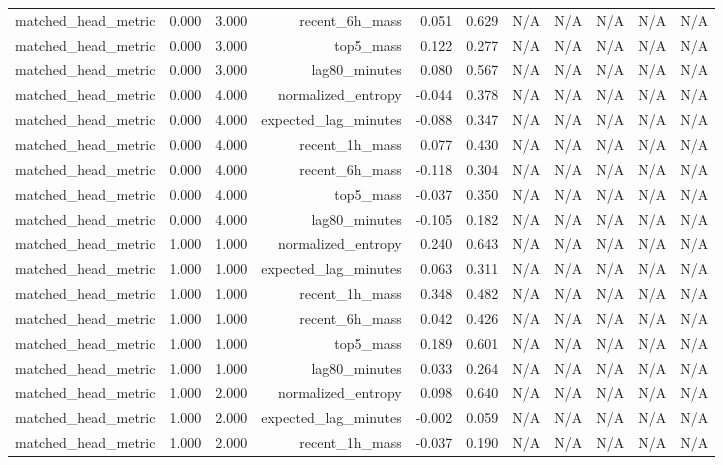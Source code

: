 \begin{table}[h!]
\begin{tabular}{lrrrrrrrrrr}
matched\_head\_metric & 0.000 & 3.000 & recent\_6h\_mass & 0.051 & 0.629 & N/A & N/A & N/A & N/A & N/A \\
matched\_head\_metric & 0.000 & 3.000 & top5\_mass & 0.122 & 0.277 & N/A & N/A & N/A & N/A & N/A \\
matched\_head\_metric & 0.000 & 3.000 & lag80\_minutes & 0.080 & 0.567 & N/A & N/A & N/A & N/A & N/A \\
matched\_head\_metric & 0.000 & 4.000 & normalized\_entropy & -0.044 & 0.378 & N/A & N/A & N/A & N/A & N/A \\
matched\_head\_metric & 0.000 & 4.000 & expected\_lag\_minutes & -0.088 & 0.347 & N/A & N/A & N/A & N/A & N/A \\
matched\_head\_metric & 0.000 & 4.000 & recent\_1h\_mass & 0.077 & 0.430 & N/A & N/A & N/A & N/A & N/A \\
matched\_head\_metric & 0.000 & 4.000 & recent\_6h\_mass & -0.118 & 0.304 & N/A & N/A & N/A & N/A & N/A \\
matched\_head\_metric & 0.000 & 4.000 & top5\_mass & -0.037 & 0.350 & N/A & N/A & N/A & N/A & N/A \\
matched\_head\_metric & 0.000 & 4.000 & lag80\_minutes & -0.105 & 0.182 & N/A & N/A & N/A & N/A & N/A \\
matched\_head\_metric & 1.000 & 1.000 & normalized\_entropy & 0.240 & 0.643 & N/A & N/A & N/A & N/A & N/A \\
matched\_head\_metric & 1.000 & 1.000 & expected\_lag\_minutes & 0.063 & 0.311 & N/A & N/A & N/A & N/A & N/A \\
matched\_head\_metric & 1.000 & 1.000 & recent\_1h\_mass & 0.348 & 0.482 & N/A & N/A & N/A & N/A & N/A \\
matched\_head\_metric & 1.000 & 1.000 & recent\_6h\_mass & 0.042 & 0.426 & N/A & N/A & N/A & N/A & N/A \\
matched\_head\_metric & 1.000 & 1.000 & top5\_mass & 0.189 & 0.601 & N/A & N/A & N/A & N/A & N/A \\
matched\_head\_metric & 1.000 & 1.000 & lag80\_minutes & 0.033 & 0.264 & N/A & N/A & N/A & N/A & N/A \\
matched\_head\_metric & 1.000 & 2.000 & normalized\_entropy & 0.098 & 0.640 & N/A & N/A & N/A & N/A & N/A \\
matched\_head\_metric & 1.000 & 2.000 & expected\_lag\_minutes & -0.002 & 0.059 & N/A & N/A & N/A & N/A & N/A \\
matched\_head\_metric & 1.000 & 2.000 & recent\_1h\_mass & -0.037 & 0.190 & N/A & N/A & N/A & N/A & N/A \\

\end{tabular}
\end{table}
